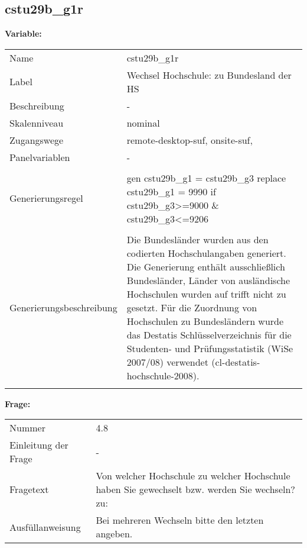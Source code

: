 	
	
	\subsection{cstu29b\_g1r}
	\label{subSection:cstu29b_g1r}

	\noindent\textbf{Variable:}\\
		\begin{tabular}{lL{11.3cm}}
			\label{tableVariable:cstu29b_g1r}
			Name & cstu29b\_g1r \\
			Label & Wechsel Hochschule: zu Bundesland der HS \\
			Beschreibung & - \\
			Skalenniveau & nominal \\
			Zugangswege &
				remote-desktop-suf,
				onsite-suf,
 \\
			Panelvariablen & -
			 \\
			 \\
					Generierungsregel & gen cstu29b\_g1 = cstu29b\_g3
replace cstu29b\_g1  = 9990 if cstu29b\_g3\textgreater{}=9000 \& cstu29b\_g3\textless{}=9206 \\
				 \\
					Generierungsbeschreibung & Die Bundesländer wurden aus den codierten Hochschulangaben generiert. Die Generierung enthält ausschließlich Bundesländer, Länder von ausländische Hochschulen wurden auf trifft nicht zu gesetzt. Für die Zuordnung von Hochschulen zu Bundesländern wurde das Destatis Schlüsselverzeichnis für die Studenten- und Prüfungsstatistik (WiSe 2007/08) verwendet (cl-destatis-hochschule-2008).
				 \\	
			 \\
		\end{tabular}

		\vspace*{1 cm}
		\noindent\textbf{Frage:}\\
		\begin{tabular}{lL{11.3cm}}
			\label{tableQuestion:cstu29b_g1r}
			Nummer & 4.8 \\
			Einleitung der Frage & - \\
			Fragetext & Von welcher Hochschule zu welcher Hochschule haben Sie gewechselt bzw. werden Sie wechseln?
zu: \\
			Ausfüllanweisung & Bei mehreren Wechseln bitte den letzten angeben. \\
		\end{tabular}





